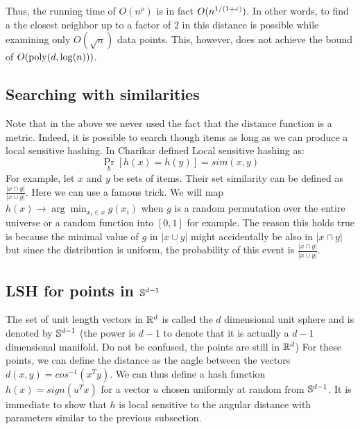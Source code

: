 \documentclass{article}
\begin{document}
Thus, the running time of $O(n^{\rho})$ is in fact $O(n^{1/(1+\varepsilon)})$. In other words, to find a
the closest neighbor up to a factor of $2$ in this distance is possible while examining only $O(\sqrt{n})$ data points.
This, however, does not achieve the bound of $O({\operatorname{poly}}(d,\log(n)))$.  

\subsection{Searching with similarities}
Note that in the above we never used the fact that the distance function is a metric. 
Indeed, it is possible to search though items as long as we can produce a local sensitive hashing.
In \cite{Charikar02} Charikar defined Local sensitive hashing as:
\[
\Pr_{h}[h(x)=h(y)] = sim(x,y)
\]
For example, let $x$ and $y$ be sets of items. Their set similarity can be defined as $\frac{| x \cap y|}{|x \cup y|}$.
Here we can use a famous trick. We will map $h(x) \rightarrow \arg \min_{x_i \in x} g(x_i)$ when $g$ is a random permutation over
the entire universe or a random function into $[0,1]$ for example. The reason this holds true is because 
the minimal value of $g$ in $|x \cup y|$ might accidentally be also in $| x \cap y|$ but 
since the distribution is uniform, the probability of this event is $\frac{| x \cap y|}{|x \cup y|}$.
 
 \subsection{LSH for points in ${\mathbb{S}}^{d-1}$}
The set of unit length vectors in ${\mathbb{R}}^{d}$ is called the $d$ dimensional unit sphere and is denoted by  ${\mathbb{S}}^{d-1}$
(the power is $d-1$ to denote that it is actually a $d-1$ dimensional manifold. Do not be confused, the points are still in ${\mathbb{R}}^d$)
For these points, we can define the distance as the angle between the vectors $d(x,y) = cos^{-1}(x^{T}y)$.
We can thus define a hash function $h(x) = sign(u^{T}x)$ for a vector $u$ chosen uniformly at random from ${\mathbb{S}}^{d-1}$.
It is immediate to show that $h$ is local sensitive to the angular distance with parameters similar to the previous subsection.



\end{document}
